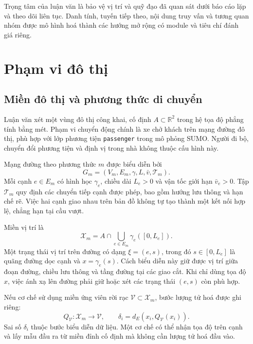 \documentclass[12pt,a4paper,oneside]{report}
\begin{document}
Trọng tâm của luận văn là bảo vệ vị trí và quỹ đạo đã quan sát dưới báo cáo lặp và theo dõi liên tục. Danh tính, tuyến tiếp theo, nội dung truy vấn và tương quan nhóm được mô hình hoá thành các hướng mở rộng có module và tiêu chí đánh giá riêng.

\chapter{Phạm vi đô thị}
\label{ch:urban}

\section{Miền đô thị và phương thức di chuyển}

Luận văn xét một vùng đô thị công khai, cố định $A\subset\mathbb R^2$ trong hệ tọa độ phẳng tính bằng mét. Phạm vi chuyển động chính là xe chở khách trên mạng đường đô thị, phù hợp với lớp phương tiện \texttt{passenger} trong mô phỏng SUMO. Người đi bộ, chuyển đổi phương tiện và định vị trong nhà không thuộc cấu hình này.

Mạng đường theo phương thức $m$ được biểu diễn bởi
\[
G_m=(V_m,E_m,\gamma,L,\bar v,\mathcal T_m).
\]
Mỗi cạnh $e\in E_m$ có hình học $\gamma_e$, chiều dài $L_e>0$ và vận tốc giới hạn $\bar v_e>0$. Tập $\mathcal T_m$ quy định các chuyển tiếp cạnh được phép, bao gồm hướng lưu thông và hạn chế rẽ. Việc hai cạnh giao nhau trên bản đồ không tự tạo thành một kết nối hợp lệ, chẳng hạn tại cầu vượt.

Miền vị trí là
\begin{equation}
\mathcal X_m=A\cap\bigcup_{e\in E_m}\gamma_e([0,L_e]).
\label{eq:urban-domain}
\end{equation}
Một trạng thái vị trí trên đường có dạng $\xi=(e,s)$, trong đó $s\in[0,L_e]$ là quãng đường dọc cạnh và $x=\gamma_e(s)$. Cách biểu diễn này giữ được vị trí giữa đoạn đường, chiều lưu thông và tầng đường tại các giao cắt. Khi chỉ dùng tọa độ $x$, việc ánh xạ lên đường phải giữ hoặc xét các trạng thái $(e,s)$ còn phù hợp.

Nếu cơ chế sử dụng miền ứng viên rời rạc $\mathcal V\subset\mathcal X_m$, bước lượng tử hoá được ghi riêng:
\[
Q_{\mathcal V}:\mathcal X_m\longrightarrow\mathcal V,\qquad
\delta_i=d_E(x_i,Q_{\mathcal V}(x_i)).
\]
Sai số $\delta_i$ thuộc bước biểu diễn dữ liệu. Một cơ chế có thể nhận tọa độ trên cạnh và lấy mẫu đầu ra từ miền đỉnh cố định mà không cần lượng tử hoá đầu vào.
\end{document}
